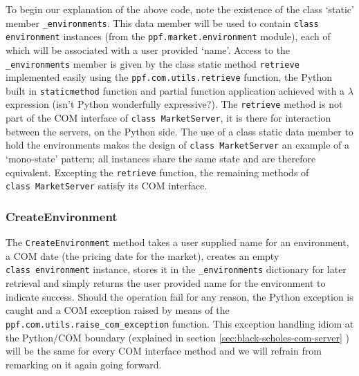 To begin our explanation of the above code, note the existence of the
class `static' member \verb|_environments|. This data member will be
used to contain \verb|class environment| instances (from the
\verb|ppf.market.environment| module), each of which will be
associated with a user provided `name'. Access to the
\verb|_environments| member is given by the class static method
\verb|retrieve| implemented easily using the
\verb|ppf.com.utils.retrieve| function, the Python built in
\verb|staticmethod| function and partial function application achieved
with a $\lambda$ expression (isn't Python wonderfully
expressive?). The \verb|retrieve| method is not part of the COM
interface of \verb|class MarketServer|, it is there for interaction
between the servers, on the Python side. The use of a class static
data member to hold the environments makes the design of 
\verb|class MarketServer| an example of a `mono-state' pattern; all
instances share the same state and are therefore equivalent. Excepting
the \verb|retrieve| function, the remaining methods of \\
\verb|class MarketServer| satisfy its COM interface.

\subsubsection{CreateEnvironment}
The \verb|CreateEnvironment| method takes a user supplied name for an
environment, a COM date (the pricing date for the market), creates an
empty \\ 
\verb|class environment| instance, stores it in the
\verb|_environments| dictionary for later retrieval and simply returns
the user provided name for the environment to indicate success. Should
the operation fail for any reason, the Python exception is caught and
a COM exception raised by means of the \\
\verb|ppf.com.utils.raise_com_exception| function. This exception
handling idiom at the Python/COM boundary (explained in section
\ref{sec:black-scholes-com-server} ) will be the same for every COM
interface method and we will refrain from remarking on it again going
forward.

